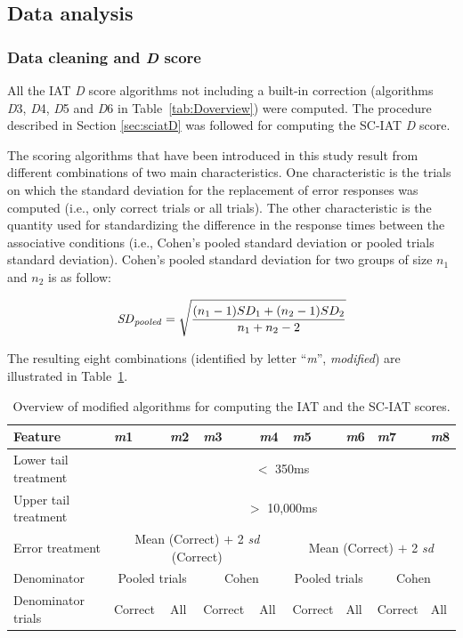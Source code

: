 \documentclass[12pt]{book}
\begin{document}
\subsection{Data analysis}
\subsubsection{Data cleaning and \emph{D} score}

All the IAT \emph{D} score algorithms not including a built-in correction (algorithms \emph{D}3, \emph{D}4, \emph{D}5 and \emph{D}6 in Table~\ref{tab:Doverview}) were computed. The procedure described in Section \ref{sec:sciatD} was followed for computing the SC-IAT \emph{D} score.

The scoring algorithms that have been introduced in this study result from different combinations of two main characteristics. One characteristic is the trials on which the standard deviation for the replacement of error responses was computed (i.e., only correct trials or all trials). The other characteristic is the quantity used for standardizing the difference in the response times between the associative conditions (i.e., Cohen's pooled standard deviation or pooled trials standard deviation). 
Cohen's pooled standard deviation for two groups of size $n_1$ and $n_2$ is as follow: 

\begin{equation}
	\text{\emph{SD}}_{\text{\emph{pooled}}} = \sqrt\frac{(n_1-1)SD_1 + (n_2 -1)SD_2}{n_1 + n_2 -2}
\end{equation}

The resulting eight combinations (identified by letter ``\emph{m}'', \emph{modified}) are illustrated in Table~\ref{tab:modified}. 

\begin{table}[h!]
	\centering \doublespacing 
	\caption{\label{tab:modified} Overview of modified algorithms for computing the IAT and the SC-IAT scores.}
	\begin{tabular}{l p{1cm} p{1cm}p{1cm} p{1cm}p{1cm} p{1cm}p{1cm} p{1cm}}
		\toprule
		Feature & \emph{m}1 & \emph{m}2  & \emph{m}3 & \emph{m}4 & \emph{m}5 & \emph{m}6 & \emph{m}7 & \emph{m}8 \\
		\midrule
		Lower tail treatment & \multicolumn{8}{c}{$<$ 350ms}\\
		Upper tail treatment & \multicolumn{8}{c}{$>$ 10,000ms}\\
		Error treatment & \multicolumn{4}{c}{Mean (Correct) $+$ 2 \emph{sd} (Correct)}  & \multicolumn{4}{c}{Mean (Correct) $+$ 2 \emph{sd}}\\
		Denominator & \multicolumn{2}{c}{Pooled trials} & \multicolumn{2}{c}{Cohen} & \multicolumn{2}{c}{Pooled trials} & \multicolumn{2}{c}{Cohen}\\  
		Denominator trials & Correct & All  & Correct & All & Correct & All & Correct & All \\
		\bottomrule
	\end{tabular}
\end{table}
\end{document}
